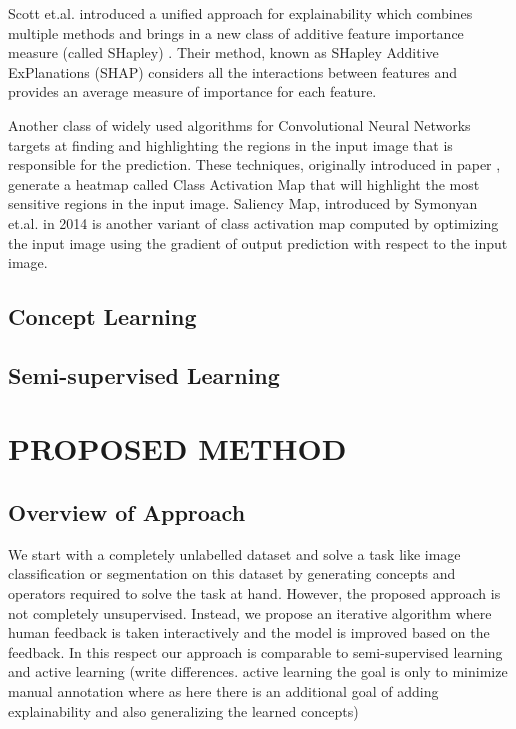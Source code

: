 \documentclass{JMLFS}
\begin{document}
Scott et.al. introduced a unified approach for explainability which combines multiple methods and brings in a new class of additive feature importance measure (called SHapley) \cite{lundberg2017unified}.
Their method, known as SHapley Additive ExPlanations (SHAP) considers all  the interactions between features and provides an average measure of importance for each feature.

Another class of widely used algorithms for  Convolutional Neural Networks  targets at finding and highlighting the  regions in the input image that is responsible for the prediction.
These techniques, originally introduced in paper \cite{zhou2016learning}, generate a heatmap called Class Activation Map that will highlight the most sensitive regions in the input image.
Saliency Map, introduced by Symonyan et.al. in 2014 \cite{simonyan2014deep} is another variant of class activation map computed by optimizing the input image using the gradient of output prediction with respect to the input image.

\subsection{Concept Learning}
\subsection{Semi-supervised Learning}

\section{{ PROPOSED METHOD}}\label{proposed_method}

\subsection{Overview of Approach}
We start with a completely unlabelled dataset and solve a task like image classification or segmentation on this dataset by generating concepts and operators required to solve the task at hand.
However, the proposed approach is not completely unsupervised.
Instead, we propose an iterative algorithm where human feedback is taken interactively and the model is improved based on the feedback.
In this respect our approach is comparable to semi-supervised learning and active learning (write differences. active learning the goal is only to minimize manual annotation where as here there is an additional goal of adding explainability and also generalizing the learned concepts)
\end{document}

